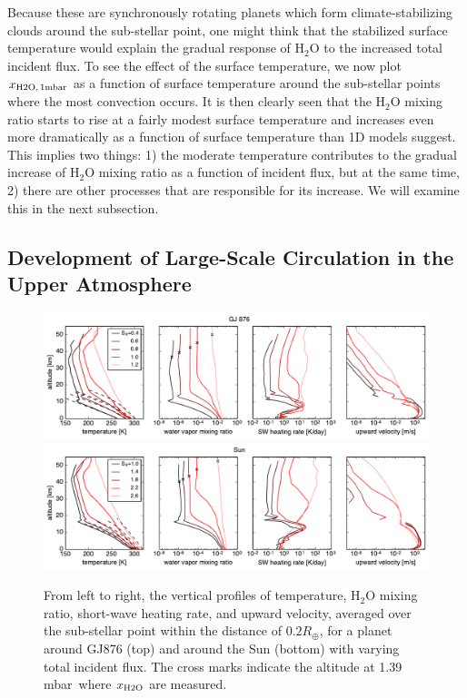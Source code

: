 \documentclass[11pt,numberedappendix,twocolappendix,]{emulateapj}
\def\water{H$_2$O }
\def\xwater{$x_{\rm H2O,\,1mbar}$ }
\def\preslevel{1.39 mbar\ }
\begin{document}
Because these are synchronously rotating planets which form climate-stabilizing clouds around the sub-stellar point, one might think that the stabilized surface temperature would explain the gradual response of \water to the increased total incident flux. 
To see the effect of the surface temperature, we now plot \xwater as a function of surface temperature around the sub-stellar points where the most convection occurs. 
It is then clearly seen that the \water mixing ratio starts to rise at a fairly modest surface temperature and increases even more dramatically as a function of surface temperature than 1D models suggest. 
This implies two things: 1) the moderate temperature contributes to the gradual increase of \water mixing ratio as a function of incident flux, but at the same time, 2) there are other processes that are responsible for its increase. 
We will examine this in the next subsection. 

\subsection{Development of Large-Scale Circulation in the Upper Atmosphere}
\label{ss:result_omega}


\begin{figure}[htb]
    \begin{center}
    \includegraphics[width=1\hsize]{fig/AqOH0TLS_GJ876_temp_xH2O_vz_heat.pdf}
    \includegraphics[width=1\hsize]{fig/AqOH0TLS_Sun_temp_xH2O_vz_heat.pdf}
    \end{center}
\caption{From left to right, the vertical profiles of temperature, \water mixing ratio, short-wave heating rate, and upward velocity, averaged over the sub-stellar point within the distance of $0.2R_{\oplus }$, for a planet around GJ876 (top) and around the Sun (bottom) with varying total incident flux. The cross marks indicate the altitude at \preslevel where  $x_{\rm H2O}$ are measured. }
\label{fig:AqOH0TLS_GJ876_temp_xH2O_vz_heat}
\end{figure}
\end{document}
